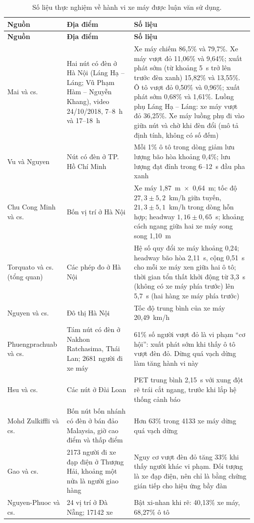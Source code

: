 \documentclass[../DoAn.tex]{subfiles}
\begin{document}
\begingroup\small
\begin{longtable}{|p{3.1cm}|p{3.4cm}|p{7.5cm}|}
\caption{Số liệu thực nghiệm về hành vi xe máy được luận văn sử dụng.}\label{table:2.1}\\
\hline
\textbf{Nguồn} & \textbf{Địa điểm} & \textbf{Số liệu} \\
\hline
\endfirsthead
\hline
\textbf{Nguồn} & \textbf{Địa điểm} & \textbf{Số liệu} \\
\hline
\endhead
Mai và cs.~\cite{mai2019signal} & Hai nút có đèn ở Hà Nội (Láng Hạ -- Láng; Vũ Phạm Hàm -- Nguyễn Khang), video 24/10/2018, 7--8~h và 17--18~h & Xe máy chiếm 86,5\% và 79,7\%. Xe máy vượt đỏ 11,06\% và 9,64\%; xuất phát sớm (từ khoảng 5~s trở lên trước đèn xanh) 15,82\% và 13,55\%. Ô tô vượt đỏ 0,50\% và 0,96\%; xuất phát sớm 0,68\% và 1,61\%. Luồng phụ Láng Hạ -- Láng: xe máy vượt đỏ 36,25\%. Xe máy luồng phụ đi vào giữa nút và chờ khi đèn đổi (mô tả định tính, không có số đếm) \\
\hline
Vu và Nguyen~\cite{vu2015saturation} & Nút có đèn ở TP. Hồ Chí Minh & Mỗi 1\% ô tô trong dòng giảm lưu lượng bão hòa khoảng 0,4\%; lưu lượng đạt đỉnh trong 6--12~s đầu pha xanh \\
\hline
Chu Cong Minh và cs.~\cite{chu2005speed} & Bốn vị trí ở Hà Nội & Xe máy 1,87~m~$\times$~0,64~m; tốc độ $27{,}3 \pm 5{,}2$~km/h giữa tuyến, $21{,}3 \pm 5{,}1$~km/h trong dòng hỗn hợp; headway $1{,}16 \pm 0{,}65$~s; khoảng cách ngang giữa hai xe máy song song 1,10~m \\
\hline
Torquato và cs.~\cite{torquato2020motorcycles} (tổng quan) & Các phép đo ở Hà Nội & Hệ số quy đổi xe máy khoảng 0,24; headway bão hòa 2,11~s, cộng 0,51~s cho mỗi xe máy xen giữa hai ô tô; thời gian tổn thất khởi động từ 3,3~s (không có xe máy phía trước) lên 5,7~s (hai hàng xe máy phía trước) \\
\hline
Nguyen và cs.~\cite{nguyen2022motorcycles} & Đô thị Hà Nội & Tốc độ trung bình của xe máy 20,49~km/h \\
\hline
Phuengprachuab và cs.~\cite{phuengprachuab2023opportunistic} & Tám nút có đèn ở Nakhon Ratchasima, Thái Lan; 2681 người đi xe máy & 61\% số người vượt đỏ là vi phạm ``cơ hội'': xuất phát sớm khi thấy ô tô vượt đèn đỏ. Dừng quá vạch dừng làm tăng hành vi này \\
\hline
Hsu và cs.~\cite{hsu2024v2x} & Các nút ở Đài Loan & PET trung bình 2,15~s với xung đột rẽ trái cắt ngang, trước khi lắp hệ thống cảnh báo \\
\hline
Mohd Zulkiffli và cs.~\cite{zulkiffli2023stopping} & Bốn nút bốn nhánh có đèn ở bán đảo Malaysia, giờ cao điểm và thấp điểm & Hơn 63\% trong 4133 xe máy dừng quá vạch dừng \\
\hline
Gao và cs.~\cite{gao2020redlight} & 2173 người đi xe đạp điện ở Thượng Hải, khoảng một nửa là người giao hàng & Nguy cơ vượt đèn đỏ tăng 33\% khi thấy người khác vi phạm. Đối tượng là xe đạp điện, nên chỉ là bằng chứng gián tiếp cho hiệu ứng bầy đàn \\
\hline
Nguyen-Phuoc và cs.~\cite{nguyenphuoc2019turnsignal} & 24 vị trí ở Đà Nẵng; 17142 xe & Bật xi-nhan khi rẽ: 40,13\% xe máy, 68,27\% ô tô \\
\hline
\end{longtable}
\endgroup
\end{document}
